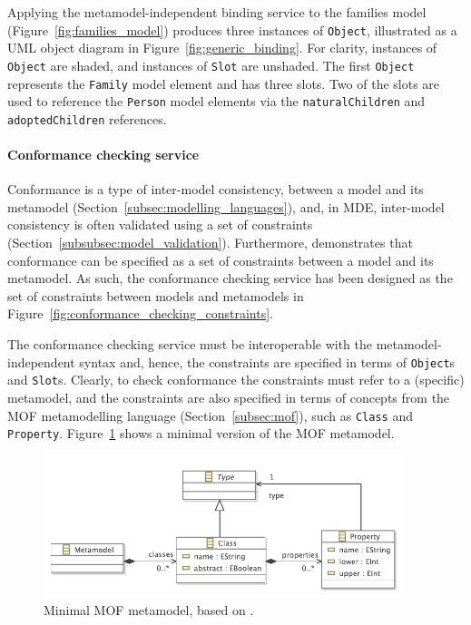 Applying the metamodel-independent binding service to the families model (Figure~\ref{fig:families_model}) produces three instances of \texttt{Ob\-je\-ct}, illustrated as a UML object diagram in Figure~\ref{fig:generic_binding}. For clarity, instances of \texttt{Ob\-je\-ct} are shaded, and instances of \texttt{Sl\-ot} are unshaded. The first \texttt{Ob\-je\-ct} represents the \texttt{Fa\-mi\-ly} model element and has three slots. Two of the slots are used to reference the \texttt{Pe\-rs\-on} model elements via the \texttt{na\-tu\-r\-alCh\-il\-dr\-en} and \texttt{ad\-op\-t\-edCh\-il\-dr\-en} references. 


\paragraph{Conformance checking service} Conformance is a type of inter-model consistency, between a model and its metamodel (Section~\ref{subsec:modelling_languages}), and, in MDE, inter-model consistency is often validated using a set of constraints (Section~\ref{subsubsec:model_validation}). Furthermore, \cite{paige07metamodel} demonstrates that conformance can be specified as a set of constraints between a model and its metamodel. As such, the conformance checking service has been designed as the set of constraints between models and metamodels in Figure~\ref{fig:conformance_checking_constraints}.

The conformance checking service must be interoperable with the metamodel-independent syntax and, hence, the constraints are specified in terms of \texttt{Ob\-je\-ct}s and \texttt{Sl\-ot}s. Clearly, to check conformance the constraints must refer to a (specific) metamodel, and the constraints are also specified in terms of concepts from the MOF metamodelling language (Section~\ref{subsec:mof}), such as \texttt{Class} and \texttt{Property}. Figure~\ref{fig:minimal_mof} shows a minimal version of the MOF metamodel.

\begin{figure}[p]
  \centering
  \includegraphics[width=10.5cm]{5.Implementation/images/minimal_mof.pdf}
  \caption{Minimal MOF metamodel, based on \cite{mof}.}
  \label{fig:minimal_mof}
\end{figure}

